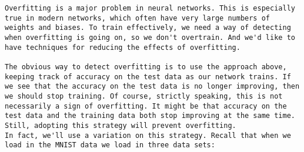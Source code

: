 \begin{lstlisting}
Overfitting is a major problem in neural networks. This is especially true in modern networks, which often have very large numbers of weights and biases. To train effectively, we need a way of detecting when overfitting is going on, so we don't overtrain. And we'd like to have techniques for reducing the effects of overfitting.

The obvious way to detect overfitting is to use the approach above, keeping track of accuracy on the test data as our network trains. If we see that the accuracy on the test data is no longer improving, then we should stop training. Of course, strictly speaking, this is not necessarily a sign of overfitting. It might be that accuracy on the test data and the training data both stop improving at the same time. Still, adopting this strategy will prevent overfitting.
In fact, we'll use a variation on this strategy. Recall that when we load in the MNIST data we load in three data sets: 
 

\end{lstlisting}
